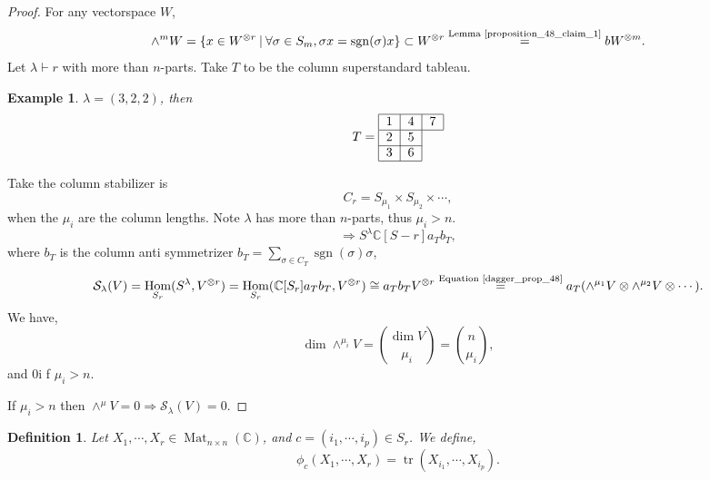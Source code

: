 \documentclass[10pt]{article}
\newtheorem{definition}{Definition}[section]
\newtheorem{example}{Example}[section]
\numberwithin{equation}{theorem}
\DeclareMathOperator{\tr}{tr}
\DeclareMathOperator{\Hom}{Hom}
\DeclareMathOperator{\sgn}{sgn}
\DeclareMathOperator{\Mat}{Mat}
\newcommand{\C}[0]{\mathbb{C}}
\newcommand{\sep}[0]{\:|\:}
\begin{document}
\begin{proof}
  For any vectorspace $W$,
  \begin{equation}
    \label{dagger_prop_48}
    \wedge^m W = \{x\in W^{\otimes r}\sep \forall \sigma\in S_m, \sigma x = \sgn(\sigma)x\}\subset W^{\otimes r} \stackrel{\text{Lemma \ref{proposition_48_claim_1}}}{=}bW^{\otimes m}.
  \end{equation}
  Let $\lambda\vdash r$ with more than $n$-parts. Take $T$ to be the column superstandard tableau.
  \begin{example}
    $\lambda = (3,2,2)$, then 
    \begin{equation*}
      T=
      \begin{tabular}{|l|l|l}
\hline
$1$ & $4$ & \multicolumn{1}{l|}{$7$} \\ \hline
$2$ & $5$ &                        \\ \cline{1-2}
$3$ & $6$ &                        \\ \cline{1-2}
\end{tabular}
    \end{equation*}
  \end{example}
  Take the column stabilizer is 
  \begin{equation*}
    C_r = S_{\mu_1}\times S_{\mu_2}\times\cdots,
  \end{equation*}
  when the $\mu_i$ are the column lengths. Note $\lambda$ has more than $n$-parts, thus $\mu_i>n$. 
  \begin{equation*}
    \Rightarrow S^\lambda\C[S-r]a_Tb_T,
  \end{equation*}
  where $b_T$ is the column anti symmetrizer $b_T = \sum_{\sigma\in C_T}\sgn(\sigma)\sigma$,
  \begin{equation*}
    \mathcal{S}_\lambda(V) = \Hom_{S_r}(S^\lambda,V^{\otimes r}) = \Hom_{S_r}(\C[S_r]a_Tb_T,V^{\otimes r})\cong a_Tb_TV^{\otimes r}\stackrel{\text{Equation \eqref{dagger_prop_48}}}{=}a_T(\wedge^{\mu_1}V\otimes \wedge^{\mu_2}V\otimes \cdots).
  \end{equation*}
  We have,
  \begin{equation*}
    \dim\wedge^{\mu_i}V = {\dim V\choose \mu_i} = {n \choose \mu_i},
  \end{equation*}
  and $0$i f $\mu_i>n$.\\
  \par If $\mu_i>n$ then $\wedge^\mu V= 0\Rightarrow\mathcal{S}_\lambda(V) = 0$.
\end{proof}
\begin{definition}
Let $X_1,\cdots,X_r\in\Mat_{n\times n}(\C)$, and $c=(i_1,\cdots,i_p)\in S_r$. We define,
\begin{equation*}
  \phi_c(X_1,\cdots,X_r)=\tr(X_{i_1},\cdots,X_{i_p}).
\end{equation*}
\end{definition}
\end{document}
